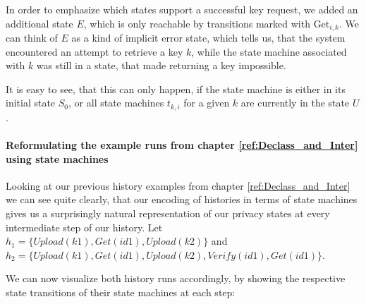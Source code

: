 In order to emphasize which states support a successful key request, we added an additional state \(E\), which is only reachable by transitions marked with \(\text{Get}_{i,k}\). We can think of \(E\) as a kind of implicit error state, which tells us, that the system encountered an attempt to retrieve a key \(k\), while the state machine associated with \(k\) was still in a state, that made returning a key impossible. 

It is easy to see, that this can only happen, if the state machine is either in its initial state \(S_0\), or all state machines \(t_{k,i}\) for a given \(k\) are currently in the state \(U\).
\\
\paragraph{Reformulating the example runs from chapter \ref{ref:Declass_and_Inter} using state machines}
Looking at our previous history examples from chapter \ref{ref:Declass_and_Inter} we can see quite clearly, that our encoding of histories in terms of state machines gives us a surprisingly natural representation of our privacy states at every intermediate step of our history.
Let \(h_1=\{Upload(k1),Get(id1),Upload(k2)\}\) and \(h_2 = \{Upload(k1),Get(id1),Upload(k2),Verify(id1),Get(id1)\}\).

We can now visualize both history runs accordingly, by showing the respective state transitions of their state machines at each step:

